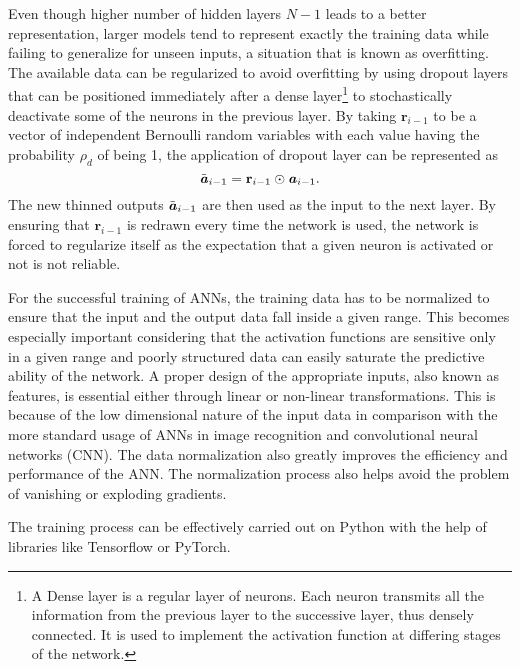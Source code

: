 Even though higher number of hidden layers $ N-1 $ leads to a better representation, larger models tend to represent exactly the training data while failing to generalize for unseen inputs, a situation that is known as overfitting\cite{bishopPatternRecognitionMachine2006}. The available data can be regularized to avoid overfitting by using dropout layers\cite{srivastavaDropoutSimpleWay2014} that can be positioned immediately after a dense layer\footnote{A Dense layer is a regular layer of neurons. Each neuron transmits all the information from the previous layer to the successive layer, thus densely connected. It is used to implement the activation function at differing stages of the network\cite{teamKerasDocumentationDense}.} to stochastically deactivate some of the neurons in the previous layer.
By taking $ \textbf{r}_{i-1} $ to be a vector of independent Bernoulli random variables with each value having the probability $ \rho_d $ of being 1, the application of dropout layer can be represented as 
\begin{equation}\label{eq-nn-dropout}
\tilde{\textbf{\textit{a}}}_{i-1}=\textbf{r}_{i-1}\odot\textbf{\textit{a}}_{i-1}.
\end{equation}
The new thinned outputs $ \tilde{\textbf{\textit{a}}}_{i-1} $ are then used as the input to the next layer. By ensuring that $ \textbf{r}_{i-1} $ is redrawn every time the network is used, the network is forced to regularize itself as the expectation that a given neuron is activated or not is not reliable.

For the successful training of ANNs, the training data has to be normalized to ensure that the input and the output data fall inside a given range. This becomes especially important considering that the activation functions are sensitive only in a given range and poorly structured data can easily saturate the predictive ability of the network. A proper design of the appropriate inputs, also known as features, is essential either through linear or non-linear transformations. This is because of the low dimensional nature of the input data in comparison with the more standard usage of ANNs in image recognition and convolutional neural networks (CNN). The data normalization also greatly improves the efficiency and performance of the ANN. The normalization process also helps avoid the problem of vanishing or exploding gradients.

The training process can be effectively carried out on Python with the help of libraries like Tensorflow\cite{abadiTensorFlowLargeScaleMachine2016} or PyTorch\cite{ketkarIntroductionPyTorch2017}.

